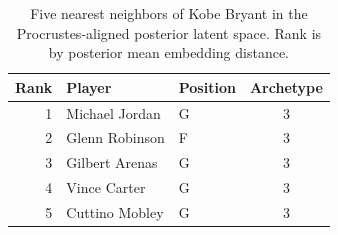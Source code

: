 \begin{table}[htbp]
  \centering\small
  \begin{tabular}{rllc}
    \toprule
    Rank & Player & Position & Archetype \\
    \midrule
    1 & Michael Jordan & G & 3 \\
    2 & Glenn Robinson & F & 3 \\
    3 & Gilbert Arenas & G & 3 \\
    4 & Vince Carter & G & 3 \\
    5 & Cuttino Mobley & G & 3 \\
    \bottomrule
  \end{tabular}
  \caption{Five nearest neighbors of Kobe Bryant in the Procrustes-aligned posterior latent space. Rank is by posterior mean embedding distance.}
  \label{tab:Kobe_Bryant_neighbors}
\end{table}

